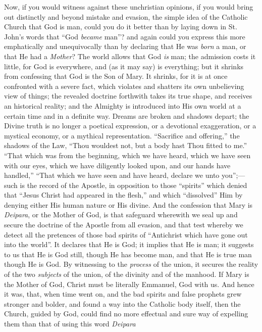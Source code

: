 Now, if you would witness against these unchristian opinions, if
you would bring out distinctly and beyond mistake and evasion, the
simple idea of the Catholic Church that God is man, could you do it
better than by laying down in St. John's words that ``God \emph{became}
man''? and again could you express this more emphatically and
unequivocally than by declaring that He was \emph{born} a man, or that He had
a \emph{Mother}? The world allows that God \emph{is} man; the
admission costs it little, for God is everywhere, and (as it may say)
is everything; but it shrinks from confessing that God is the Son of
Mary. It shrinks, for it is at once confronted with a severe fact,
which violates and shatters its own unbelieving view of things; the
revealed doctrine forthwith takes its true shape, and receives an
historical reality; and the Almighty is introduced into His own world
at a certain time and in a definite way. Dreams are broken and shadows
depart; the Divine truth is no longer a poetical expression, or a
devotional exaggeration, or a mystical economy, or a mythical
representation. ``Sacrifice and offering,'' the shadows of the
Law, ``Thou wouldest not, but a body hast Thou fitted to me.''
``That
which was from the beginning, which we have heard, which we have seen
with our eyes, which we have diligently looked upon, and our hands
have handled,'' ``That which we have seen and have heard,
declare we unto you'';—such is the record of the Apostle, in
opposition to those ``spirits'' which denied that ``Jesus
Christ had appeared in the flesh,'' and which
``dissolved'' Him by denying either His human nature or His
divine. And the confession that Mary is \emph{Deipara}, or the Mother
of God, is that safeguard wherewith we seal up and secure the doctrine
of the Apostle from all evasion, and that test whereby we detect all
the pretences of those bad spirits of ``Antichrist which have gone
out into the world''. It declares that He is God; it implies that
He is man; it suggests to us that He is God still, though He has
become man, and that He is true man though He is God. By witnessing to
the \emph{process} of the union, it secures the reality of the two \emph{subjects}
of the union, of the divinity and of the manhood. If Mary is the
Mother of God, Christ must be literally Emmanuel, God with us. And
hence it was, that, when time went on, and the bad spirits and false
prophets grew stronger and bolder, and found a way into the Catholic
body itself, then the Church, guided by God, could find no more
effectual and sure way of expelling them than that of using this word \emph{Deipara}
